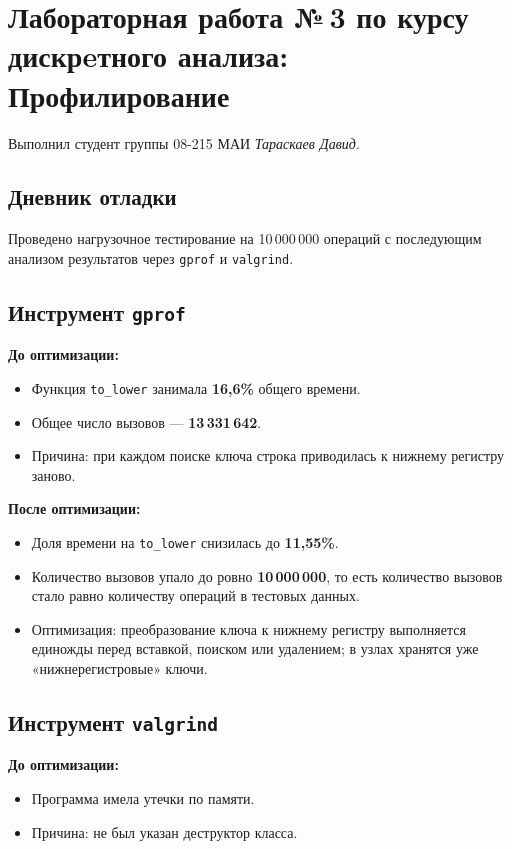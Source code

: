 \documentclass[12pt]{article}
\begin{document}
\section*{Лабораторная работа №\,3 по курсу дискрeтного анализа: Профилирование
}

Выполнил студент группы 08-215 МАИ \textit{Тараскаев Давид}.

\subsection*{Дневник отладки}
Проведено нагрузочное тестирование на 10\,000\,000 операций с последующим анализом результатов через \texttt{gprof} и \texttt{valgrind}.

\subsection*{Инструмент \texttt{gprof}}
    \noindent\textbf{До оптимизации:}
    \begin{itemize}
      \item Функция \texttt{to\_lower} занимала \textbf{16,6\%} общего времени.
      \item Общее число вызовов — \textbf{13\,331\,642}.
      \item Причина: при каждом поиске ключа строка приводилась к нижнему регистру заново.
    \end{itemize}
    
    \noindent\textbf{После оптимизации:}
    \begin{itemize}
      \item Доля времени на \texttt{to\_lower} снизилась до \textbf{11,55\%}.
      \item Количество вызовов упало до ровно \textbf{10\,000\,000}, то есть количество вызовов стало равно количеству операций в тестовых данных.
      \item Оптимизация: преобразование ключа к нижнему регистру выполняется единожды перед вставкой, поиском или удалением; в узлах хранятся уже «нижнерегистровые» ключи.
    \end{itemize}

\subsection*{Инструмент \texttt{valgrind}}
\noindent\textbf{До оптимизации:}
\begin{itemize}
    \item Программа имела утечки по памяти.
    \item Причина: не был указан деструктор класса.
\end{itemize}
\end{document}
